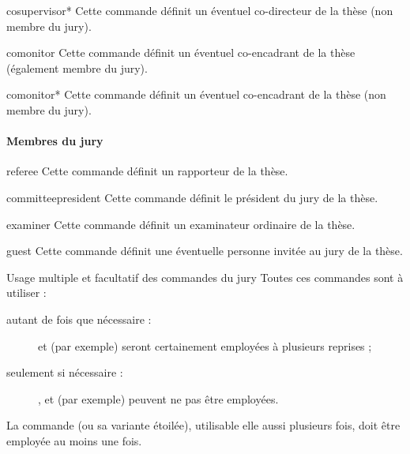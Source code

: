 \begin{docCommand}{cosupervisor*}{}
  Cette commande définit un éventuel co-directeur de la thèse (non membre du jury).
\end{docCommand}

\begin{docCommand}{comonitor}{}
  Cette commande définit un éventuel co-encadrant de la thèse (également membre du jury).
\end{docCommand}

\begin{docCommand}{comonitor*}{}
  Cette commande définit un éventuel co-encadrant de la thèse (non membre du jury).
\end{docCommand}

\paragraph{Membres du jury}\label{sec:definition-jury}

\begin{docCommand}{referee}{}
  Cette commande définit un rapporteur de la thèse.
\end{docCommand}

\begin{docCommand}{committeepresident}{}
  Cette commande définit le président du jury de la thèse.
\end{docCommand}

\begin{docCommand}{examiner}{}
  Cette commande définit un examinateur ordinaire de la thèse.
\end{docCommand}

\begin{docCommand}{guest}{}
  Cette commande définit une éventuelle personne invitée au jury de la thèse.
\end{docCommand}
%
\begin{dbwarning}{Usage multiple et facultatif des commandes du
    jury}{}
  Toutes ces commandes sont à utiliser :
  \begin{description}
  \item[autant de fois que nécessaire :]
     et  (par exemple) seront
    certainement employées à plusieurs reprises ;
  \item[seulement si nécessaire :]
    ,  et  (par
    exemple) peuvent ne pas être employées.
  \end{description}
  La commande  (ou sa variante étoilée), utilisable elle
  aussi plusieurs fois, doit être employée au moins une fois.
\end{dbwarning}

